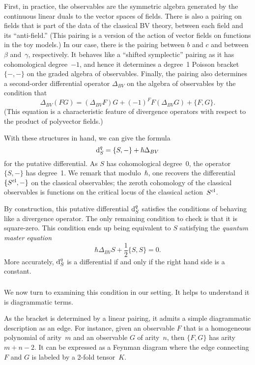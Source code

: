 First, in practice, the observables are the symmetric algebra generated by the continuous linear duals to the vector spaces of fields.
There is also a pairing on fields that is part of the data of the classical BV theory,
between each field and its ``anti-field.''
(This pairing is a version of the action of vector fields on functions in the toy models.)
In our case, there is the pairing between $b$ and $c$ and between $\beta$ and~$\gamma$, respectively.
It behaves like a ``shifted symplectic'' pairing as it has cohomological degree~$-1$,
and hence it determines a degree~1 Poisson bracket $\{-,-\}$ on the graded algebra of observables.
Finally, the pairing also determines a second-order differential operator $\Delta_{BV}$ on the algebra of observables by the condition that
\[
\Delta_{BV}(FG) = (\Delta_{BV}F)G + (-1)^F F(\Delta_{BV}G) + \{F,G\}.
\]
(This equation is a characteristic feature of divergence operators with respect to the product of polyvector fields.)

With these structures in hand, we can give the formula
\[
{\rm d}^q_S=\{S,-\} + \hbar\Delta_{BV}
\]
for the putative differential.
As $S$ has cohomological degree~0, the operator $\{S,-\}$ has degree~1.
We remark that modulo~$\hbar$, one recovers the differential $\{S^{\rm cl},-\}$ on the classical observables;
the zeroth cohomology of the classical observables is functions on the critical locus of the classical action~$S^{\rm cl}$.

By construction, this putative differential ${\rm d}_S^q$ satisfies the conditions of behaving like a divergence operator.
The only remaining condition to check is that it is square-zero.
This condition ends up being equivalent to $S$ satisfying the {\em quantum master equation}
\begin{equation}
\hbar \Delta_{BV} S + \frac{1}{2}\{S,S\} = 0.
\end{equation}
More accurately, ${\rm d}^q_S$ is a differential if and only if the right hand side is a constant.


\subsubsection{}

We now turn to examining this condition in our setting.
It helps to understand it is diagrammatic terms.

As the bracket is determined by a linear pairing,
it admits a simple diagrammatic description as an edge.
For instance, given an observable $F$ that is a homogeneous polynomial of arity~$m$
and an observable $G$ of arity~$n$, 
then $\{F,G\}$ has arity~$m+n-2$.
It can be expressed as a Feynman diagram 
where the edge connecting $F$ and $G$ is labeled by a 2-fold tensor~$K$.


